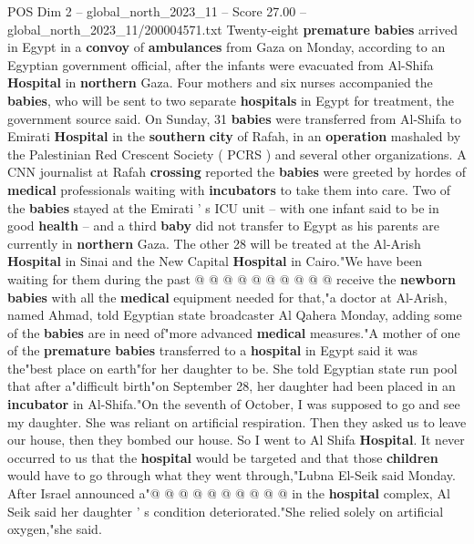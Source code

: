 \begin{textsample}{POS Dim 2 – global\_north\_2023\_11 – Score 27.00 – global\_north\_2023\_11/200004571.txt}  \label{ex:f2_pos_236}
Twenty-eight \textbf{premature} \textbf{babies} arrived in Egypt in a \textbf{convoy} of \textbf{ambulances} from Gaza on Monday, according to an Egyptian government official, after the infants were evacuated from Al-Shifa \textbf{Hospital} in \textbf{northern} Gaza.
Four mothers and six nurses accompanied the \textbf{babies}, who will be sent to two separate \textbf{hospitals} in Egypt for treatment, the government source said.
On Sunday, 31 \textbf{babies} were transferred from Al-Shifa to Emirati \textbf{Hospital} in the \textbf{southern} \textbf{city} of Rafah, in an \textbf{operation} mashaled by the Palestinian Red Crescent Society ( PCRS ) and several other organizations.
A CNN journalist at Rafah \textbf{crossing} reported the \textbf{babies} were greeted by hordes of \textbf{medical} professionals waiting with \textbf{incubators} to take them into care.
Two of the \textbf{babies} stayed at the Emirati ' s ICU unit -- with one infant said to be in good \textbf{health} -- and a third \textbf{baby} did not transfer to Egypt as his parents are currently in \textbf{northern} Gaza.
The other 28 will be treated at the Al-Arish \textbf{Hospital} in Sinai and the New Capital \textbf{Hospital} in Cairo."We have been waiting for them during the past @ @ @ @ @ @ @ @ @ @ receive the \textbf{newborn} \textbf{babies} with all the \textbf{medical} equipment needed for that,"a doctor at Al-Arish, named Ahmad, told Egyptian state broadcaster Al Qahera Monday, adding some of the \textbf{babies} are in need of"more advanced \textbf{medical} measures."A mother of one of the \textbf{premature} \textbf{babies} transferred to a \textbf{hospital} in Egypt said it was the"best place on earth"for her daughter to be.
She told Egyptian state run pool that after a"difficult birth"on September 28, her daughter had been placed in an \textbf{incubator} in Al-Shifa."On the seventh of October, I was supposed to go and see my daughter.
She was reliant on artificial respiration.
Then they asked us to leave our house, then they bombed our house.
So I went to Al Shifa \textbf{Hospital}.
It never occurred to us that the \textbf{hospital} would be targeted and that those \textbf{children} would have to go through what they went through,"Lubna El-Seik said Monday.
After Israel announced a"@ @ @ @ @ @ @ @ @ @ in the \textbf{hospital} complex, Al Seik said her daughter ' s condition deteriorated."She relied solely on artificial oxygen,"she said.

\end{textsample}
